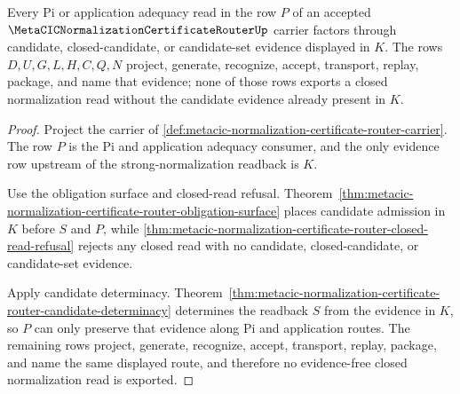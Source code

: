 \begin{theorem}
\label{thm:metacic-normalization-certificate-router-adequacy-evidence-source}
Every Pi or application adequacy read in the row $P$ of an accepted $\MetaCICNormalizationCertificateRouterUp$ carrier factors through candidate, closed-candidate, or candidate-set evidence displayed in $K$. The rows $D,U,G,L,H,C,Q,N$ project, generate, recognize, accept, transport, replay, package, and name that evidence; none of those rows exports a closed normalization read without the candidate evidence already present in $K$.
\end{theorem}
\begin{proof}
Project the carrier of \autoref{def:metacic-normalization-certificate-router-carrier}. The row $P$ is the Pi and application adequacy consumer, and the only evidence row upstream of the strong-normalization readback is $K$.

Use the obligation surface and closed-read refusal. Theorem~\ref{thm:metacic-normalization-certificate-router-obligation-surface} places candidate admission in $K$ before $S$ and $P$, while \autoref{thm:metacic-normalization-certificate-router-closed-read-refusal} rejects any closed read with no candidate, closed-candidate, or candidate-set evidence.

Apply candidate determinacy. Theorem~\ref{thm:metacic-normalization-certificate-router-candidate-determinacy} determines the readback $S$ from the evidence in $K$, so $P$ can only preserve that evidence along Pi and application routes. The remaining rows project, generate, recognize, accept, transport, replay, package, and name the same displayed route, and therefore no evidence-free closed normalization read is exported.
\end{proof}

